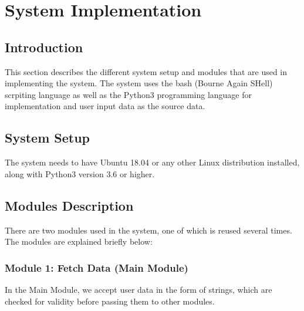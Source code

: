 \documentclass[12pt,a4paper]{report}
\begin{document}



\newpage
\chapter{System Implementation}
\section{Introduction}
This section describes the different system setup and modules that are used in implementing the system. The system uses the bash (Bourne Again SHell) scrpiting language as well as the Python3 programming language for implementation and user input data as the source data. 
\section{System Setup}
The system needs to have Ubuntu 18.04 or any other Linux distribution installed, along with Python3 version 3.6 or higher.

\section{Modules Description}
There are two modules used in the system, one of which is reused several times. The modules are explained briefly below:
\newpage
\subsection{Module 1: Fetch Data (Main Module)}
In the Main Module, we accept user data in the form of strings, which are checked for validity before passing them to other modules.
\end{document}
